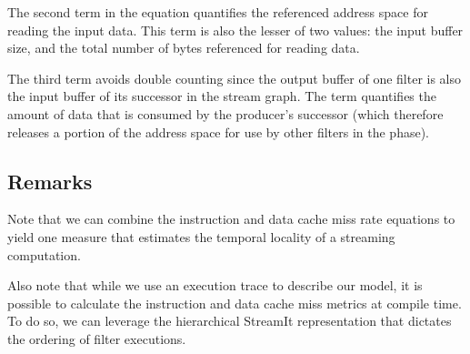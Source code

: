 The second term in the equation quantifies the referenced address space 
for reading the input data. This term is also the lesser of two
values: the input buffer size, and the total number of bytes referenced for
reading data.

The third term avoids double counting since the output buffer of one
filter is also the input buffer of its successor in the stream
graph. The term quantifies the amount of data that is consumed by the
producer's successor (which therefore releases a portion of the
address space for use by other filters in the phase).

\subsection{Remarks}

Note  that we can  combine the  instruction and  data cache  miss rate
equations to yield one measure that estimates the temporal locality of
a streaming computation.

Also note that while we use  an execution trace to describe our model,
it  is possible  to  calculate  the instruction  and  data cache  miss
metrics at  compile time.  To do so,  we can leverage  the hierarchical
StreamIt   representation  that  dictates   the  ordering   of  filter
executions.
